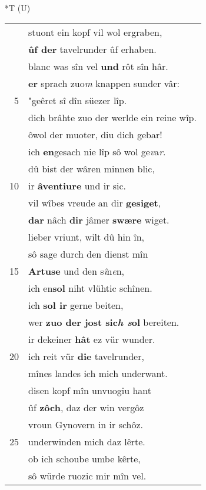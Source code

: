 \documentclass[8pt,a4paper,notitlepage]{article}
\begin{document}
\begin{table}[ht]
\begin{minipage}[t]{0.5\linewidth}
\end{minipage}
\hspace{0.5cm}
\begin{minipage}[t]{0.5\linewidth}
\small
\begin{center}*T (U)
\end{center}
\begin{tabular}{rl}
 & stuont ein kopf vil wol ergraben,\\ 
 & \textbf{ûf der} tavelrunder ûf erhaben.\\ 
 & blanc was sîn vel \textbf{und} rôt sîn hâr.\\ 
 & \textbf{er} sprach zuo\textit{m} knappen sunder vâr:\\ 
5 & "geêret sî dîn süezer lîp.\\ 
 & dich brâhte zuo der werlde ein reine wîp.\\ 
 & ôwol der muoter, diu dich gebar!\\ 
 & ich \textbf{en}gesach nie lîp sô wol ge\textit{v}a\textit{r}.\\ 
 & dû bist der wâren minnen blic,\\ 
10 & ir \textbf{âventiure} und ir sic.\\ 
 & vil wîbes vreude an dir \textbf{gesiget},\\ 
 & \textbf{dar} nâch \textbf{dir} jâmer \textbf{swære} wiget.\\ 
 & lieber vriunt, wilt dû hin în,\\ 
 & sô sage durch den dienst mîn\\ 
15 & \textbf{Artuse} und den s\textit{î}n\textit{e}n,\\ 
 & ich en\textbf{sol} niht vlühtic schînen.\\ 
 & ich \textbf{sol ir} gerne beiten,\\ 
 & wer \textbf{zuo der jost sic\textit{h s}ol} bereiten.\\ 
 & ir dekeiner \textbf{hât} ez vür wunder.\\ 
20 & ich reit vür \textbf{die} tavelrunder,\\ 
 & mînes landes ich mich underwant.\\ 
 & disen kopf mîn unvuogiu hant\\ 
 & ûf \textbf{zôch}, daz der win vergôz\\ 
 & vroun Gynovern in ir schôz.\\ 
25 & underwinden mich daz lêrte.\\ 
 & ob ich schoube umbe kêrte,\\ 
 & sô würde ruozic mir mîn vel.\\ 

\end{tabular}
\end{minipage}
\end{table}
\end{document}
